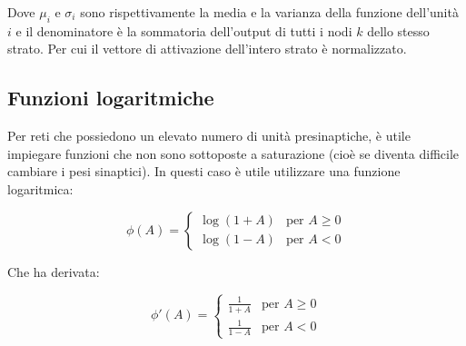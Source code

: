 Dove $\mu_i$ e $\sigma_i$ sono rispettivamente la media e la varianza della
funzione dell'unità $i$ e il denominatore è la sommatoria dell'output di tutti i
nodi $k$ dello stesso strato. Per cui il vettore di attivazione dell'intero
strato è normalizzato.

\subsection{Funzioni logaritmiche}

Per reti che possiedono un elevato numero di unità presinaptiche, è utile
impiegare funzioni che non sono sottoposte a saturazione (cioè se diventa
difficile cambiare i pesi sinaptici). In questi caso è utile utilizzare una
funzione logaritmica:

\begin{equation*}
	\phi(A) = \begin{cases}
		\log(1 + A) & \text{per } A \geq 0 \\
		\log(1 - A) & \text{per } A < 0
	\end{cases}
\end{equation*}

Che ha derivata:

\begin{equation*}
	\phi'(A) = \begin{cases}
		\frac{1}{1 + A} & \text{per } A \geq 0 \\
		\frac{1}{1 - A} & \text{per } A < 0
	\end{cases}
\end{equation*}

\begin{center}
\end{center}

